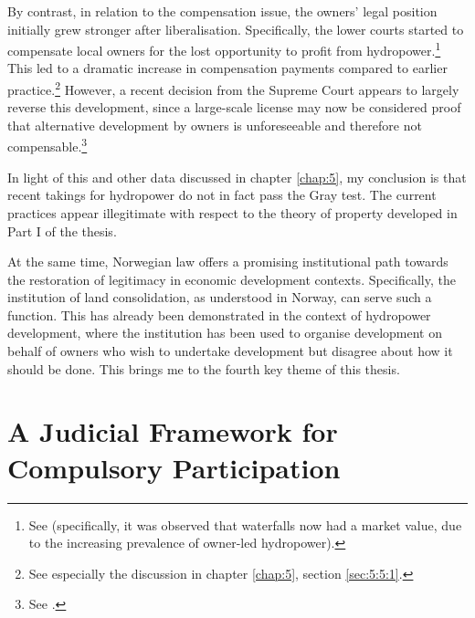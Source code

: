 By contrast, in relation to the compensation issue, the owners' legal position initially grew stronger after liberalisation. Specifically, the lower courts started to compensate local owners for the lost opportunity to profit from hydropower.\footnote{See \cite{uleberg08} (specifically, it was observed that waterfalls now had a market value, due to the increasing prevalence of owner-led hydropower).} This led to a dramatic increase in compensation payments compared to earlier practice.\footnote{See especially the discussion in chapter \ref{chap:5}, section \ref{sec:5:5:1}.} However, a recent decision from the Supreme Court appears to largely reverse this development, since a large-scale license may now be considered proof that alternative development by owners is unforeseeable and therefore not compensable.\footnote{See \cite{otra13}.} 

In light of this and other data discussed in chapter \ref{chap:5}, my conclusion is that recent takings for hydropower do not in fact pass the Gray test. The current practices appear illegitimate with respect to the theory of property developed in Part I of the thesis. 

At the same time, Norwegian law offers a promising institutional path towards the restoration of legitimacy in economic development contexts. Specifically, the institution of land consolidation, as understood in Norway, can serve such a function. This has already been demonstrated in the context of hydropower development, where the institution has been used to organise development on behalf of owners who wish to undertake development  but disagree about how it should be done. This brings me to the fourth key theme of this thesis.

\section{A Judicial Framework for Compulsory Participation}\label{sec:4}

